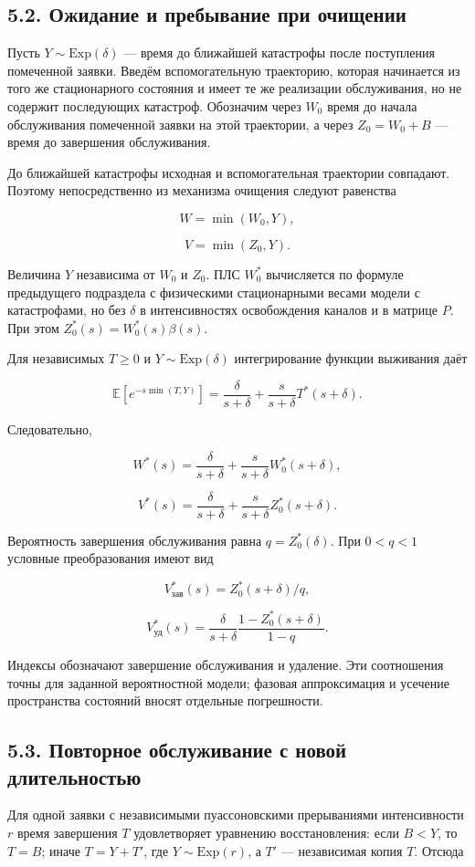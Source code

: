 \subsection*{5.2. Ожидание и пребывание при очищении}
Пусть \(Y\sim\mathrm{Exp}(\delta)\) --- время до ближайшей катастрофы после поступления помеченной заявки. Введём вспомогательную траекторию, которая начинается из того же стационарного состояния и имеет те же реализации обслуживания, но не содержит последующих катастроф. Обозначим через \(W_0\) время до начала обслуживания помеченной заявки на этой траектории, а через \(Z_0=W_0+B\) --- время до завершения обслуживания.

До ближайшей катастрофы исходная и вспомогательная траектории совпадают. Поэтому непосредственно из механизма очищения следуют равенства


\[W=\min(W_0,Y),\]

\[V=\min(Z_0,Y).\]


Величина \(Y\) независима от \(W_0\) и \(Z_0.\) ПЛС \(W_0^*\) вычисляется по формуле предыдущего подраздела с физическими стационарными весами модели с катастрофами, но без \(\delta\) в интенсивностях освобождения каналов и в матрице \(P.\) При этом \(Z_0^*(s)=W_0^*(s)\beta(s).\)

Для независимых \(T\ge0\) и \(Y\sim\mathrm{Exp}(\delta)\) интегрирование функции выживания даёт


\[\mathbb E[e^{-s\min(T,Y)}]=\frac{\delta}{s+\delta}+\frac{s}{s+\delta}T^*(s+\delta).\]


Следовательно,


\[W^*(s)=\frac{\delta}{s+\delta}+\frac{s}{s+\delta}W_0^*(s+\delta),\]

\[V^*(s)=\frac{\delta}{s+\delta}+\frac{s}{s+\delta}Z_0^*(s+\delta).\]


Вероятность завершения обслуживания равна \(q=Z_0^*(\delta).\) При \(0<q<1\) условные преобразования имеют вид


\[V_{\text{зав}}^*(s)=Z_0^*(s+\delta)/q,\]

\[V_{\text{уд}}^*(s)=\frac{\delta}{s+\delta}\frac{1-Z_0^*(s+\delta)}{1-q}.\]


Индексы обозначают завершение обслуживания и удаление. Эти соотношения точны для заданной вероятностной модели; фазовая аппроксимация и усечение пространства состояний вносят отдельные погрешности.

\subsection*{5.3. Повторное обслуживание с новой длительностью}
Для одной заявки с независимыми пуассоновскими прерываниями интенсивности \(r\) время завершения \(T\) удовлетворяет уравнению восстановления: если \(B<Y\), то \(T=B\); иначе \(T=Y+T'\), где \(Y\sim\mathrm{Exp}(r)\), а \(T'\) --- независимая копия \(T.\) Отсюда \cite{pal2017}


